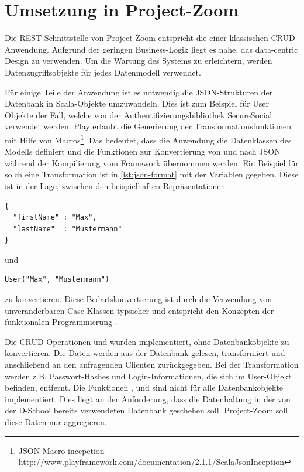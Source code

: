 \section{Umsetzung in Project-Zoom}
Die REST-Schnittstelle von Project-Zoom entspricht die einer klassischen CRUD-Anwendung. Aufgrund der geringen Business-Logik liegt es nahe, das data-centric Design zu verwenden. Um die Wartung des Systems zu erleichtern, werden Datenzugriffsobjekte für jedes Datenmodell verwendet.



Für einige Teile der Anwendung ist es notwendig die JSON-Strukturen der Datenbank in Scala-Objekte umzuwandeln. Dies ist zum Beispiel für User Objekte der Fall, welche von der Authentifizierungsbibliothek SecureSocial verwendet werden. Play erlaubt die Generierung der Transformationsfunktionen mit Hilfe von Macros\footnote{JSON Macro incepetion \url{http://www.playframework.com/documentation/2.1.1/ScalaJsonInception}}. Das bedeutet, dass die Anwendung die Datenklassen des Modells definiert und die Funktionen zur Konvertierung von und nach JSON während der Kompilierung vom Framework übernommen werden. Ein Beispiel für solch eine Transformation ist in \ref{lst:json-format} mit der Variablen  gegeben. Diese ist in der Lage, zwischen den beispielhaften Repräsentationen 
\begin{lstlisting} 
{ 
  "firstName" : "Max", 
  "lastName"  : "Mustermann" 
}
\end{lstlisting} und 
\begin{lstlisting} 
User("Max", "Mustermann")
\end{lstlisting} 
zu konvertieren. Diese Bedarfskonvertierung ist durch die Verwendung von unveränderbaren Case-Klassen typsicher und entspricht den Konzepten der funktionalen Programmierung \cite{functional-thinking}.

Die CRUD-Operationen  und  wurden implementiert, ohne Datenbankobjekte zu konvertieren. Die Daten werden aus der Datenbank gelesen, transformiert und anschließend an den anfragenden Clienten zurückgegeben. Bei der Transformation werden z.B. Passwort-Hashes und Login-Informationen, die sich im User-Objekt befinden, entfernt. Die Funktionen ,  und  sind nicht für alle Datenbankobjekte implementiert. Dies liegt an der Anforderung, dass die Datenhaltung in der von der D-School bereits verwendeten Datenbank geschehen soll. Project-Zoom soll diese Daten nur aggregieren.
